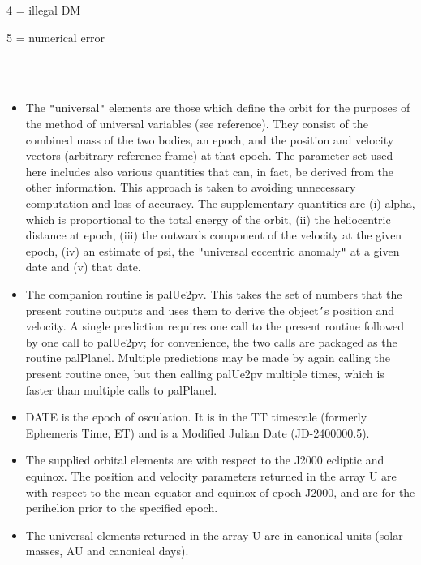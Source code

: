 \documentclass[twoside,11pt]{article}
\renewcommand{\_}{\texttt{\symbol{95}}}
\newcommand{\sstnotes}[1]{\goodbreak \item[Notes:] \mbox{} \\[1.3ex] #1}
\newcommand{\sstitemlist}[1]{
  \mbox{} \\
  \vspace{-3.5ex}
  \begin{itemize}
     #1
  \end{itemize}
}
\newcommand{\sstitem}{\item}
\newcommand{\sstnotes}[1]{\item[Notes:] #1 }
\newcommand{\sstitemlist}[1]{
      \begin{itemize}
         #1
      \end{itemize}
      \\
   }
\newcommand{\sstitem}{\item}
\begin{document}
{{{{            \sstitem
                    4 = illegal DM

            \sstitem
                    5 = numerical error
         }
      }
   }
   \sstnotes{
      \sstitemlist{

         \sstitem
         The {\tt "}universal{\tt "} elements are those which define the orbit for the
           purposes of the method of universal variables (see reference).
           They consist of the combined mass of the two bodies, an epoch,
           and the position and velocity vectors (arbitrary reference frame)
           at that epoch.  The parameter set used here includes also various
           quantities that can, in fact, be derived from the other
           information.  This approach is taken to avoiding unnecessary
           computation and loss of accuracy.  The supplementary quantities
           are (i) alpha, which is proportional to the total energy of the
           orbit, (ii) the heliocentric distance at epoch, (iii) the
           outwards component of the velocity at the given epoch, (iv) an
           estimate of psi, the {\tt "}universal eccentric anomaly{\tt "} at a given
           date and (v) that date.

         \sstitem
         The companion routine is palUe2pv.  This takes the set of numbers
           that the present routine outputs and uses them to derive the
           object{\tt '}s position and velocity.  A single prediction requires one
           call to the present routine followed by one call to palUe2pv;
           for convenience, the two calls are packaged as the routine
           palPlanel.  Multiple predictions may be made by again calling the
           present routine once, but then calling palUe2pv multiple times,
           which is faster than multiple calls to palPlanel.

         \sstitem
         DATE is the epoch of osculation.  It is in the TT timescale
           (formerly Ephemeris Time, ET) and is a Modified Julian Date
           (JD-2400000.5).

         \sstitem
         The supplied orbital elements are with respect to the J2000
           ecliptic and equinox.  The position and velocity parameters
           returned in the array U are with respect to the mean equator and
           equinox of epoch J2000, and are for the perihelion prior to the
           specified epoch.

         \sstitem
         The universal elements returned in the array U are in canonical
           units (solar masses, AU and canonical days).

}}}
\end{document}
